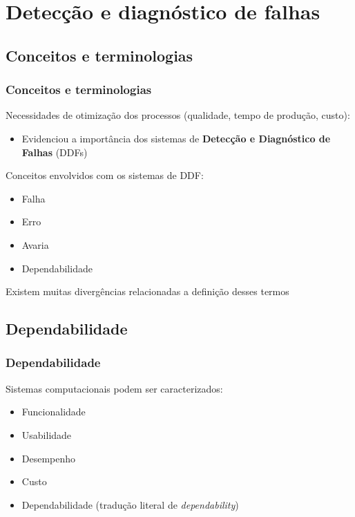 \documentclass{beamer}
\begin{document}
\section{Detecção e diagnóstico de falhas}
\subsection{Conceitos e terminologias}
\begin{frame}
    \frametitle{Conceitos e terminologias}

    Necessidades de otimização dos processos (qualidade, tempo de produção,
    custo):

\begin{itemize}
    \item Evidenciou a importância dos sistemas de {\bf Detecção e Diagnóstico
          de Falhas} (DDFs)
\end{itemize}

    Conceitos envolvidos com os sistemas de DDF:

\begin{itemize}
    \item Falha
    \item Erro
    \item Avaria
    \item Dependabilidade
\end{itemize}

    Existem muitas divergências relacionadas a definição desses termos
\end{frame}

\subsection{Dependabilidade}
\begin{frame}
    \frametitle{Dependabilidade}

    Sistemas computacionais podem ser caracterizados:

\begin{itemize}
    \item Funcionalidade
    \item Usabilidade
    \item Desempenho
    \item Custo
    \item \alert{Dependabilidade} (tradução literal de {\it dependability})
\end{itemize}

\end{frame}
\end{document}
